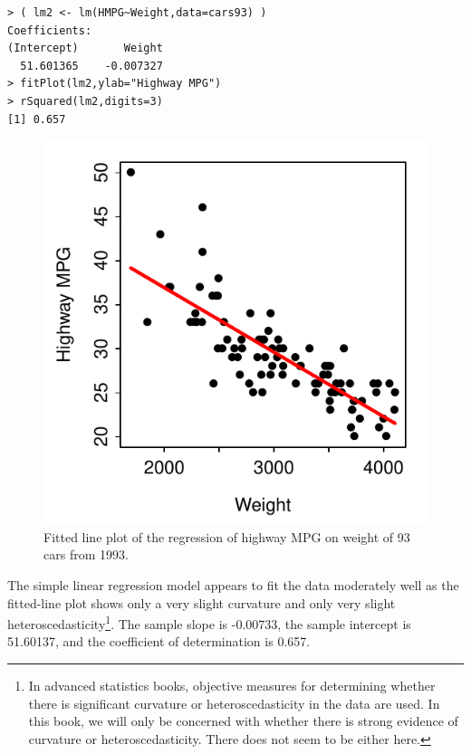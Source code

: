 \documentclass[10pt,openany]{book}\usepackage[]{graphicx}\usepackage[]{color}
\makeatletter
\newenvironment{kframe}{%
 \def\at@end@of@kframe{}%
 \ifinner\ifhmode%
  \def\at@end@of@kframe{\end{minipage}}%
  \begin{minipage}{\columnwidth}%
 \fi\fi%
 \def\FrameCommand##1{\hskip\@totalleftmargin \hskip-\fboxsep
 \colorbox{shadecolor}{##1}\hskip-\fboxsep
     \hskip-\linewidth \hskip-\@totalleftmargin \hskip\columnwidth}%
 \MakeFramed {\advance\hsize-\width
   \@totalleftmargin\z@ \linewidth\hsize
   \@setminipage}}%
 {\par\unskip\endMakeFramed%
 \at@end@of@kframe}
\newenvironment{knitrout}{}{} %
\makeatother
\begin{document}
\begin{knitrout}
\color{fgcolor}\begin{kframe}
\begin{verbatim}
> ( lm2 <- lm(HMPG~Weight,data=cars93) )
Coefficients:
(Intercept)       Weight  
  51.601365    -0.007327  
> fitPlot(lm2,ylab="Highway MPG")
> rSquared(lm2,digits=3)
[1] 0.657
\end{verbatim}
\end{kframe}\begin{figure}[hbtp]

{\centering \includegraphics[width=.4\linewidth]{Figs/CarFit-1} 

}

\caption[Fitted line plot of the regression of highway MPG on weight of 93 cars from 1993]{Fitted line plot of the regression of highway MPG on weight of 93 cars from 1993.}\label{fig:CarFit}
\end{figure}


\end{knitrout}

The simple linear regression model appears to fit the data moderately well as the fitted-line plot  shows only a very slight curvature and only very slight heteroscedasticity\footnote{In advanced statistics books, objective measures for determining whether there is significant curvature or heteroscedasticity in the data are used.  In this book, we will only be concerned with whether there is strong evidence of curvature or heteroscedasticity.  There does not seem to be either here.}.  The sample slope is -0.00733, the sample intercept is 51.60137, and the coefficient of determination is 0.657.
\end{document}
